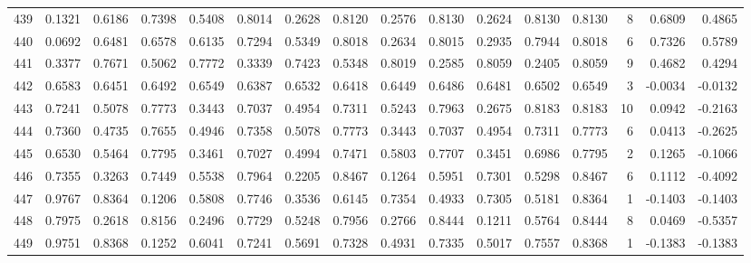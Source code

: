 \begin{tabular}{lrrrrrrrrrrrrrrr}
439 &      0.1321 &  0.6186 &  0.7398 &  0.5408 &  0.8014 &  0.2628 &  0.8120 &  0.2576 &  0.8130 &  0.2624 &   0.8130 &     0.8130 &      8 &                    0.6809 &                     0.4865 \\
440 &      0.0692 &  0.6481 &  0.6578 &  0.6135 &  0.7294 &  0.5349 &  0.8018 &  0.2634 &  0.8015 &  0.2935 &   0.7944 &     0.8018 &      6 &                    0.7326 &                     0.5789 \\
441 &      0.3377 &  0.7671 &  0.5062 &  0.7772 &  0.3339 &  0.7423 &  0.5348 &  0.8019 &  0.2585 &  0.8059 &   0.2405 &     0.8059 &      9 &                    0.4682 &                     0.4294 \\
442 &      0.6583 &  0.6451 &  0.6492 &  0.6549 &  0.6387 &  0.6532 &  0.6418 &  0.6449 &  0.6486 &  0.6481 &   0.6502 &     0.6549 &      3 &                   -0.0034 &                    -0.0132 \\
443 &      0.7241 &  0.5078 &  0.7773 &  0.3443 &  0.7037 &  0.4954 &  0.7311 &  0.5243 &  0.7963 &  0.2675 &   0.8183 &     0.8183 &     10 &                    0.0942 &                    -0.2163 \\
444 &      0.7360 &  0.4735 &  0.7655 &  0.4946 &  0.7358 &  0.5078 &  0.7773 &  0.3443 &  0.7037 &  0.4954 &   0.7311 &     0.7773 &      6 &                    0.0413 &                    -0.2625 \\
445 &      0.6530 &  0.5464 &  0.7795 &  0.3461 &  0.7027 &  0.4994 &  0.7471 &  0.5803 &  0.7707 &  0.3451 &   0.6986 &     0.7795 &      2 &                    0.1265 &                    -0.1066 \\
446 &      0.7355 &  0.3263 &  0.7449 &  0.5538 &  0.7964 &  0.2205 &  0.8467 &  0.1264 &  0.5951 &  0.7301 &   0.5298 &     0.8467 &      6 &                    0.1112 &                    -0.4092 \\
447 &      0.9767 &  0.8364 &  0.1206 &  0.5808 &  0.7746 &  0.3536 &  0.6145 &  0.7354 &  0.4933 &  0.7305 &   0.5181 &     0.8364 &      1 &                   -0.1403 &                    -0.1403 \\
448 &      0.7975 &  0.2618 &  0.8156 &  0.2496 &  0.7729 &  0.5248 &  0.7956 &  0.2766 &  0.8444 &  0.1211 &   0.5764 &     0.8444 &      8 &                    0.0469 &                    -0.5357 \\
449 &      0.9751 &  0.8368 &  0.1252 &  0.6041 &  0.7241 &  0.5691 &  0.7328 &  0.4931 &  0.7335 &  0.5017 &   0.7557 &     0.8368 &      1 &                   -0.1383 &                    -0.1383 \\

\end{tabular}
